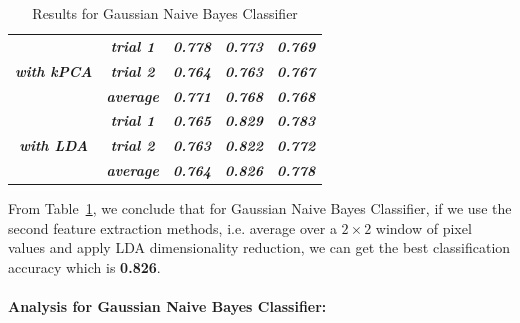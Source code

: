 \documentclass{article}
\begin{document}
\begin{table}[!h]
\begin{tabular}{|c|c|ccc|}
\textit{\textbf{}}                                                                             & \textit{\textbf{trial 1}} & \multicolumn{1}{c|}{\textit{\textbf{0.778}}} & \multicolumn{1}{c|}{\textit{\textbf{0.773}}} & \textit{\textbf{0.769}} \\ \cline{2-5} 
\textit{\textbf{with kPCA}}                                                                    & \textit{\textbf{trial 2}} & \multicolumn{1}{c|}{\textit{\textbf{0.764}}} & \multicolumn{1}{c|}{\textit{\textbf{0.763}}} & \textit{\textbf{0.767}} \\ \cline{2-5} 
\textit{\textbf{}}                                                                             & \textit{\textbf{average}} & \multicolumn{1}{c|}{\textit{\textbf{0.771}}} & \multicolumn{1}{c|}{\textit{\textbf{0.768}}} & \textit{\textbf{0.768}} \\ \hline
\textit{\textbf{}}                                                                             & \textit{\textbf{trial 1}} & \multicolumn{1}{c|}{\textit{\textbf{0.765}}} & \multicolumn{1}{c|}{\textit{\textbf{0.829}}} & \textit{\textbf{0.783}} \\ \cline{2-5} 
\textit{\textbf{with LDA}}                                                                     & \textit{\textbf{trial 2}} & \multicolumn{1}{c|}{\textit{\textbf{0.763}}} & \multicolumn{1}{c|}{\textit{\textbf{0.822}}} & \textit{\textbf{0.772}} \\ \cline{2-5} 
\textit{\textbf{}}                                                                             & \textit{\textbf{average}} & \multicolumn{1}{c|}{\textit{\textbf{0.764}}} & \multicolumn{1}{c|}{\textit{\textbf{\color{red}0.826}}} & \textit{\textbf{0.778}} \\ \hline
\end{tabular}
\caption{Results for Gaussian Naive Bayes Classifier}
\label{NB_res}
\end{table}

From Table~\ref{NB_res}, we conclude that for Gaussian Naive Bayes Classifier, if we use the second feature extraction methods, i.e. average over a $2 \times 2$ window of pixel values and apply LDA dimensionality reduction, we can get the best classification accuracy which is \textbf{0.826}.

\paragraph{Analysis for Gaussian Naive Bayes Classifier:}
\end{document}
